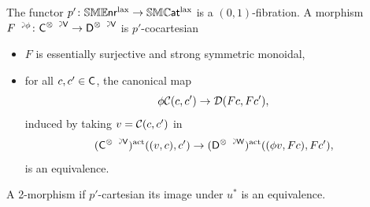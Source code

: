 \documentclass[a4paper,11pt]{article}
\begin{document}
\begin{propn}\label{propn:SMENRl cocart}
  The functor $p' \colon \SMENRl \to \SMCATl$ is a
  $(0,1)$-fibration. A morphism $\ract{F}{\phi} \colon \utract{C}{V}
  \to \utract{D}{V}$ is $p'$-cocartesian \IFF{}
  \begin{itemize}
  \item $F$ is essentially surjective and strong symmetric monoidal,
  \item for all $c,c' \in \textup{\textsf{C}}$, the canonical
    map
    \[ \phi \eC(c,c') \to \eD(F c, F c'),\]
    induced by taking $v = \mathcal{C}(c,c')$ in
    \[ (\utract{C}{V})^{\act}((v, c), c') \to
      (\utract{D}{W})^{\act}((\phi v, F c), F c'),\]
    is an equivalence.
  \end{itemize}
  A 2-morphism if $p'$-cartesian \IFF{} its image under $u^{*}$ is an
  equivalence.
\end{propn}
\end{document}
